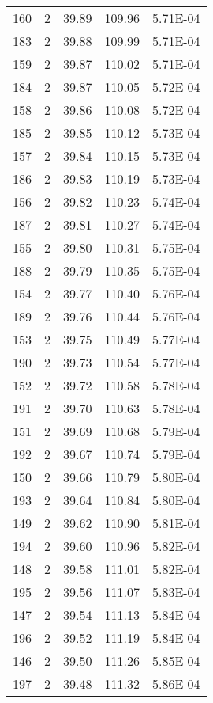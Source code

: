 \begin{longtable}{ccccc}
	160   & 2     & 39.89  & 109.96  & 5.71E-04 \\
	183   & 2     & 39.88  & 109.99  & 5.71E-04 \\
	159   & 2     & 39.87  & 110.02  & 5.71E-04 \\
	184   & 2     & 39.87  & 110.05  & 5.72E-04 \\
	158   & 2     & 39.86  & 110.08  & 5.72E-04 \\
	185   & 2     & 39.85  & 110.12  & 5.73E-04 \\
	157   & 2     & 39.84  & 110.15  & 5.73E-04 \\
	186   & 2     & 39.83  & 110.19  & 5.73E-04 \\
	156   & 2     & 39.82  & 110.23  & 5.74E-04 \\
	187   & 2     & 39.81  & 110.27  & 5.74E-04 \\
	155   & 2     & 39.80  & 110.31  & 5.75E-04 \\
	188   & 2     & 39.79  & 110.35  & 5.75E-04 \\
	154   & 2     & 39.77  & 110.40  & 5.76E-04 \\
	189   & 2     & 39.76  & 110.44  & 5.76E-04 \\
	153   & 2     & 39.75  & 110.49  & 5.77E-04 \\
	190   & 2     & 39.73  & 110.54  & 5.77E-04 \\
	152   & 2     & 39.72  & 110.58  & 5.78E-04 \\
	191   & 2     & 39.70  & 110.63  & 5.78E-04 \\
	151   & 2     & 39.69  & 110.68  & 5.79E-04 \\
	192   & 2     & 39.67  & 110.74  & 5.79E-04 \\
	150   & 2     & 39.66  & 110.79  & 5.80E-04 \\
	193   & 2     & 39.64  & 110.84  & 5.80E-04 \\
	149   & 2     & 39.62  & 110.90  & 5.81E-04 \\
	194   & 2     & 39.60  & 110.96  & 5.82E-04 \\
	148   & 2     & 39.58  & 111.01  & 5.82E-04 \\
	195   & 2     & 39.56  & 111.07  & 5.83E-04 \\
	147   & 2     & 39.54  & 111.13  & 5.84E-04 \\
	196   & 2     & 39.52  & 111.19  & 5.84E-04 \\
	146   & 2     & 39.50  & 111.26  & 5.85E-04 \\
	197   & 2     & 39.48  & 111.32  & 5.86E-04 \\

\end{longtable}
